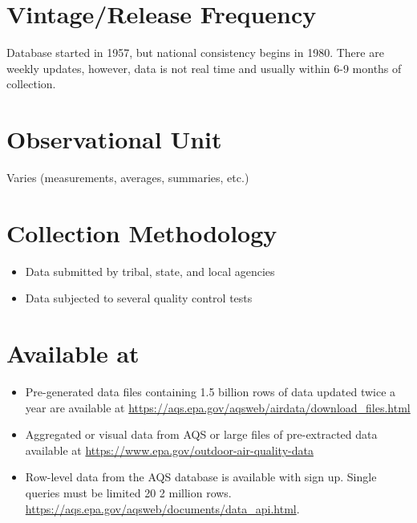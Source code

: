\documentclass[
]{book}
\providecommand{\tightlist}{%
  \setlength{\itemsep}{0pt}\setlength{\parskip}{0pt}}
\begin{document}
\hypertarget{vintagerelease-frequency-1}{%
\section{Vintage/Release Frequency}\label{vintagerelease-frequency-1}}

Database started in 1957, but national consistency begins in 1980. There are weekly updates, however, data is not real time and usually within 6-9 months of collection.

\hypertarget{observational-unit-1}{%
\section{Observational Unit}\label{observational-unit-1}}

Varies (measurements, averages, summaries, etc.)

\hypertarget{collection-methodology-1}{%
\section{Collection Methodology}\label{collection-methodology-1}}

\begin{itemize}
\tightlist
\item
  Data submitted by tribal, state, and local agencies
\item
  Data subjected to several quality control tests
\end{itemize}

\hypertarget{available-at-1}{%
\section{Available at}\label{available-at-1}}

\begin{itemize}
\tightlist
\item
  Pre-generated data files containing 1.5 billion rows of data updated twice a year are available at \url{https://aqs.epa.gov/aqsweb/airdata/download_files.html}
\item
  Aggregated or visual data from AQS or large files of pre-extracted data available at \url{https://www.epa.gov/outdoor-air-quality-data}
\item
  Row-level data from the AQS database is available with sign up. Single queries must be limited 20 2 million rows. \url{https://aqs.epa.gov/aqsweb/documents/data_api.html}.
\end{itemize}
\end{document}
